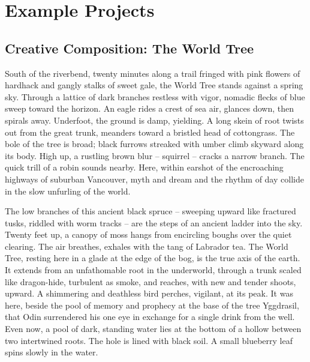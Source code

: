 \documentclass[letterpaper,10pt,headsepline]{scrreprt}
\begin{document}
\begin{compactdesc}
\end{compactdesc}
\newpage

\section{Example Projects}
\newpage

\subsection{Creative Composition: The World Tree}

South of the riverbend, twenty minutes along a trail fringed with pink
flowers of hardhack and gangly stalks of sweet gale, the World Tree
stands against a spring sky. Through a lattice of dark branches
restless with vigor, nomadic flecks of blue sweep toward the horizon.
An eagle rides a crest of sea air, glances down, then spirals away.
Underfoot, the ground is damp, yielding. A long skein of root twists
out from the great trunk, meanders toward a bristled head of
cottongrass. The bole of the tree is broad; black furrows streaked
with umber climb skyward along its body. High up, a rustling brown
blur -- squirrel -- cracks a narrow branch. The quick trill of a robin
sounds nearby. Here, within earshot of the encroaching highways of
suburban Vancouver, myth and dream and the rhythm of day collide in
the slow unfurling of the world. 

The low branches of this ancient black spruce -- sweeping upward like
fractured tusks, riddled with worm tracks -- are the steps of an ancient
ladder into the sky. Twenty feet up, a canopy of moss hangs from
encircling boughs over the quiet clearing. The air breathes, exhales
with the tang of Labrador tea. The World Tree, resting here in a glade
at the edge of the bog, is the true axis of the earth. It extends from
an unfathomable root in the underworld, through a trunk scaled like
dragon-hide, turbulent as smoke, and reaches, with new and tender
shoots, upward. A shimmering and deathless bird perches, vigilant, at
its peak. It was here, beside the pool of memory and prophecy at the
base of the tree Yggdrasil, that Odin surrendered his one eye in
exchange for a single drink from the well. Even now, a pool of dark,
standing water lies at the bottom of a hollow between two intertwined
roots. The hole is lined with black soil. A small blueberry leaf spins
slowly in the water. 
\end{document}
